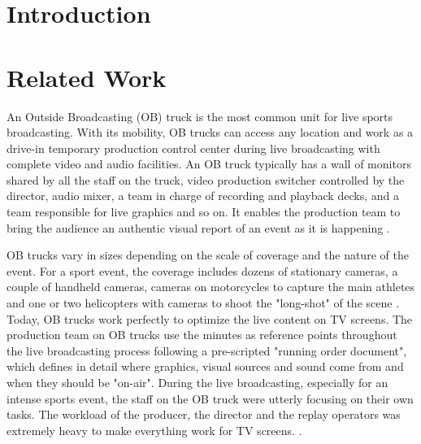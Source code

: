 \documentclass[sigchi-a, authorversion]{acmart}
\begin{document}


\begin{abstract}
    \ldots
\end{abstract}





\maketitle

\section{Introduction}

\section{Related Work}

An Outside Broadcasting (OB) truck is the most common unit for live sports broadcasting. With its mobility, OB trucks can access any location and work as a drive-in temporary production control center during live broadcasting with complete video and audio facilities. An OB truck typically has a wall of monitors shared by all the staff on the truck, video production switcher controlled by the director, audio mixer, a team in charge of recording and playback decks, and a team responsible for live graphics and so on. It enables the production team to bring the audience an authentic visual report of an event as it is happening \cite{owens2012, owens2015}.

OB trucks vary in sizes depending on the scale of coverage and the nature of the event. For a sport event, the coverage includes dozens of stationary cameras, a couple of handheld cameras, cameras on motorcycles to capture the main athletes and one or two helicopters with cameras to shoot the "long-shot" of the scene \cite{owens2012, li2018}. Today, OB trucks work perfectly to optimize the live content on TV screens. The production team on OB trucks use the minutes as reference points throughout the live broadcasting process following a pre-scripted "running order document", which defines in detail where graphics, visual sources and sound come from and when they should be "on-air". During the live broadcasting, especially for an intense sports event, the staff on the OB truck were utterly focusing on their own tasks. The workload of the producer, the director and the replay operators was extremely heavy to make everything work for TV screens.
 \cite{li2018}. 
 
\end{document}
